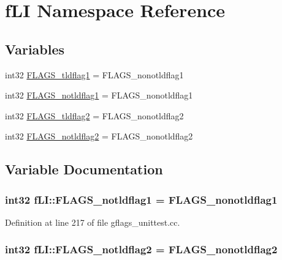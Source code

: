 \hypertarget{namespacefLI}{}\section{f\+LI Namespace Reference}
\label{namespacefLI}
\subsection*{Variables}
\begin{DoxyCompactItemize}
\item 
int32 \hyperlink{namespacefLI_a83bb5fc57fd1c06610c7b745df590fa4}{F\+L\+A\+G\+S\+\_\+tldflag1} = F\+L\+A\+G\+S\+\_\+nonotldflag1
\item 
int32 \hyperlink{namespacefLI_ab9b7b0bd66e0e83425bf1f91e6b4fc73}{F\+L\+A\+G\+S\+\_\+notldflag1} = F\+L\+A\+G\+S\+\_\+nonotldflag1
\item 
int32 \hyperlink{namespacefLI_a909cee72f7bff5b476509f7ebc7fc0d7}{F\+L\+A\+G\+S\+\_\+tldflag2} = F\+L\+A\+G\+S\+\_\+nonotldflag2
\item 
int32 \hyperlink{namespacefLI_af76f39bc115de21755ce29ad4cbb659b}{F\+L\+A\+G\+S\+\_\+notldflag2} = F\+L\+A\+G\+S\+\_\+nonotldflag2
\end{DoxyCompactItemize}


\subsection{Variable Documentation}
\subsubsection[{\texorpdfstring{F\+L\+A\+G\+S\+\_\+notldflag1}{FLAGS_notldflag1}}]{\setlength{\rightskip}{0pt plus 5cm}int32 f\+L\+I\+::\+F\+L\+A\+G\+S\+\_\+notldflag1 = F\+L\+A\+G\+S\+\_\+nonotldflag1}\hypertarget{namespacefLI_ab9b7b0bd66e0e83425bf1f91e6b4fc73}{}\label{namespacefLI_ab9b7b0bd66e0e83425bf1f91e6b4fc73}


Definition at line 217 of file gflags\+\_\+unittest.\+cc.

\subsubsection[{\texorpdfstring{F\+L\+A\+G\+S\+\_\+notldflag2}{FLAGS_notldflag2}}]{\setlength{\rightskip}{0pt plus 5cm}int32 f\+L\+I\+::\+F\+L\+A\+G\+S\+\_\+notldflag2 = F\+L\+A\+G\+S\+\_\+nonotldflag2}\hypertarget{namespacefLI_af76f39bc115de21755ce29ad4cbb659b}{}\label{namespacefLI_af76f39bc115de21755ce29ad4cbb659b}


